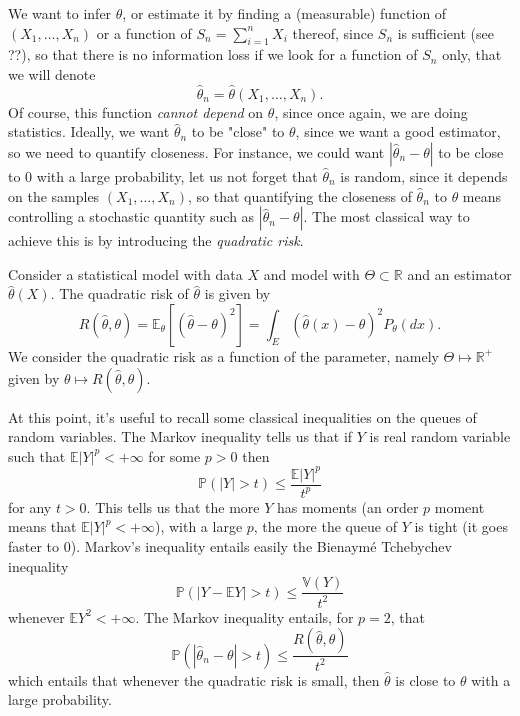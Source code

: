 \documentclass[
	fontsize=11pt, %
	twoside=false, %
	numbers=noenddot, %
]{kaobook}
\renewcommand{\P}{\mathbb P}
\newcommand{\E}{\mathbb E}
\newcommand{\R}{\mathbb R}
\newcommand{\var}{\mathbb V}
\newcommand{\wh}{\widehat}
\begin{document}
We want to infer $\theta$, or estimate it by finding a (measurable) function of $(X_1, \ldots, X_n)$ or a function of $S_n = \sum_{i=1}^n X_i$ thereof, since $S_n$ is sufficient (see ??), so that there is no information loss if we look for a function of $S_n$ only, that we will denote
\begin{equation*}
 	\wh \theta_n = \wh \theta(X_1, \ldots, X_n).
\end{equation*}
Of course, this function \emph{cannot depend} on $\theta$, since once again, we are doing statistics.
Ideally, we want $\wh \theta_n$ to be "close" to $\theta$, since we want a good estimator, so we need to quantify closeness.
For instance, we could want $|\wh \theta_n - \theta|$ to be close to $0$ with a large probability, let us not forget that $\wh \theta_n$ is random, since it depends on the samples $(X_1, \ldots, X_n)$, so that quantifying the closeness of $\wh \theta_n$ to $\theta$ means controlling a stochastic quantity such as $|\wh \theta_n - \theta|$.
The most classical way to achieve this is by introducing the \emph{quadratic risk}.
\begin{definition}
	Consider a statistical model with data $X$ and model with $\Theta \subset \R$ and an estimator $\wh \theta(X)$. The quadratic risk of $\wh \theta$ is given by
	\begin{equation*}
		R(\wh \theta, \theta) = \E_\theta[ (\wh \theta - \theta)^2 ] = \int_E (\wh \theta(x) - \theta)^2 P_\theta(dx).
	\end{equation*}
	We consider the quadratic risk as a function of the parameter, namely $\Theta \mapsto \R^+$ given by $\theta \mapsto R(\wh \theta, \theta)$.
\end{definition}
At this point, it's useful to recall some classical inequalities on the queues of random variables.
The Markov inequality tells us that if $Y$ is real random variable such that $\E |Y|^p < +\infty$ for some $p > 0$ then
\begin{equation*}
	\P(|Y| > t) \leq \frac{\E |Y|^p}{t^p}
\end{equation*}
for any $t > 0$.
This tells us that the more $Y$ has moments (an order $p$ moment means that $\E |Y|^p < +\infty$), with a large $p$, the more the queue of $Y$ is tight (it goes faster to $0$).
Markov's inequality entails easily the Bienaym\'e Tchebychev inequality
\begin{equation*}
	\P(|Y - \E Y| > t) \leq \frac{\var(Y)}{t^2}
\end{equation*}
whenever $\E Y^2 < +\infty$.
The Markov inequality entails, for $p=2$, that
\begin{equation}
	\label{eq:l2_entrails_proba}
	\P(|\wh \theta_n - \theta| > t) \leq \frac{R(\wh \theta, \theta)}{t^2}
\end{equation}
which entails that whenever the quadratic risk is small, then $\wh \theta$ is close to $\theta$ with a large probability.
\end{document}
